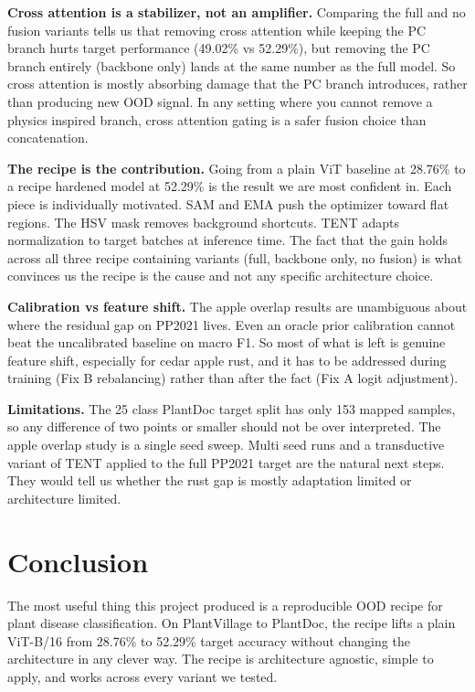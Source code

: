 \documentclass[conference]{IEEEtran}
\begin{document}
\textbf{Cross attention is a stabilizer, not an amplifier.} Comparing the full and no fusion variants tells us that removing cross attention while keeping the PC branch hurts target performance (49.02\% vs 52.29\%), but removing the PC branch entirely (backbone only) lands at the same number as the full model. So cross attention is mostly absorbing damage that the PC branch introduces, rather than producing new OOD signal. In any setting where you cannot remove a physics inspired branch, cross attention gating is a safer fusion choice than concatenation.

\textbf{The recipe is the contribution.} Going from a plain ViT baseline at 28.76\% to a recipe hardened model at 52.29\% is the result we are most confident in. Each piece is individually motivated. SAM and EMA push the optimizer toward flat regions. The HSV mask removes background shortcuts. TENT adapts normalization to target batches at inference time. The fact that the gain holds across all three recipe containing variants (full, backbone only, no fusion) is what convinces us the recipe is the cause and not any specific architecture choice.

\textbf{Calibration vs feature shift.} The apple overlap results are unambiguous about where the residual gap on PP2021 lives. Even an oracle prior calibration cannot beat the uncalibrated baseline on macro F1. So most of what is left is genuine feature shift, especially for cedar apple rust, and it has to be addressed during training (Fix B rebalancing) rather than after the fact (Fix A logit adjustment).

\textbf{Limitations.} The 25 class PlantDoc target split has only 153 mapped samples, so any difference of two points or smaller should not be over interpreted. The apple overlap study is a single seed sweep. Multi seed runs and a transductive variant of TENT applied to the full PP2021 target are the natural next steps. They would tell us whether the rust gap is mostly adaptation limited or architecture limited.

\section{Conclusion}
\label{sec:conclusion}

The most useful thing this project produced is a reproducible OOD recipe for plant disease classification. On PlantVillage to PlantDoc, the recipe lifts a plain ViT-B/16 from 28.76\% to 52.29\% target accuracy without changing the architecture in any clever way. The recipe is architecture agnostic, simple to apply, and works across every variant we tested.
\end{document}
